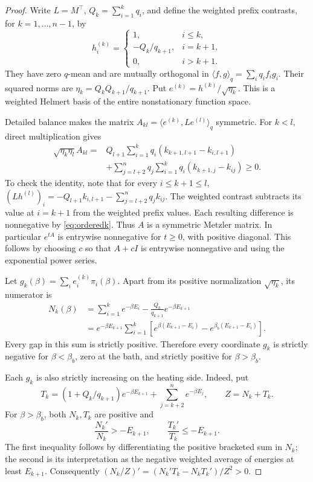 \begin{proof}
Write $L=M^\top$, $Q_k=\sum_{i=1}^kq_i$, and define the weighted prefix
contrasts, for $k=1,\ldots,n-1$, by
\[
h^{(k)}_i=\begin{cases}
1,&i\leq k,\\
-Q_k/q_{k+1},&i=k+1,\\
0,&i>k+1.
\end{cases}
\]
They have zero $q$-mean and are mutually orthogonal in
$\langle f,g\rangle_q=\sum_iq_if_ig_i$. Their squared norms are
$\eta_k=Q_kQ_{k+1}/q_{k+1}$. Put $e^{(k)}=h^{(k)}/\sqrt{\eta_k}$.
This is a weighted Helmert basis of the entire nonstationary function space.

Detailed balance makes the matrix $A_{kl}=\langle e^{(k)},Le^{(l)}\rangle_q$
symmetric. For $k<l$, direct multiplication gives
\begin{align}\label{eq:helmertoffdiag}
\sqrt{\eta_k\eta_l}A_{kl}
={}&Q_{l+1}\sum_{i=1}^kq_i(k_{k+1,l+1}-k_{i,l+1})\\
&+\sum_{j=l+2}^nq_j\sum_{i=1}^kq_i(k_{k+1,j}-k_{ij})\geq0.\nonumber
\end{align}
To check the identity, note that for every $i\leq k+1\leq l$,
$(Lh^{(l)})_i=-Q_{l+1}k_{i,l+1}-\sum_{j=l+2}^nq_jk_{ij}$.
The weighted contrast subtracts its value at $i=k+1$ from the weighted
prefix values. Each resulting difference is nonnegative by
\eqref{eq:orderedk}. Thus $A$ is a symmetric Metzler matrix. In particular
$e^{tA}$ is entrywise nonnegative for $t\geq0$, with positive diagonal.
This follows by choosing $c$ so that $A+cI$ is entrywise nonnegative and
using the exponential power series.

Let $g_k(\beta)=\sum_i e^{(k)}_i\pi_i(\beta)$. Apart from its positive
normalization $\sqrt{\eta_k}$, its numerator is
\begin{align*}
N_k(\beta)
&=\sum_{i=1}^k e^{-\beta E_i}-\frac{Q_k}{q_{k+1}}e^{-\beta E_{k+1}}\\
&=e^{-\beta E_{k+1}}\sum_{i=1}^k
\left[e^{\beta(E_{k+1}-E_i)}-e^{\beta_b(E_{k+1}-E_i)}\right].
\end{align*}
Every gap in this sum is strictly positive. Therefore every coordinate
$g_k$ is strictly negative for $\beta<\beta_b$, zero at the bath, and
strictly positive for $\beta>\beta_b$.

Each $g_k$ is also strictly increasing on the heating side. Indeed, put
\[
T_k=(1+Q_k/q_{k+1})e^{-\beta E_{k+1}}+
\sum_{j=k+2}^ne^{-\beta E_j},\qquad Z=N_k+T_k.
\]
For $\beta>\beta_b$, both $N_k,T_k$ are positive and
\[
\frac{N_k'}{N_k}>-E_{k+1},\qquad
\frac{T_k'}{T_k}\leq-E_{k+1}.
\]
The first inequality follows by differentiating the positive bracketed sum
in $N_k$; the second is its interpretation as the negative weighted average
of energies at least $E_{k+1}$. Consequently
$(N_k/Z)'=(N_k'T_k-N_kT_k')/Z^2>0$.


\end{proof}
